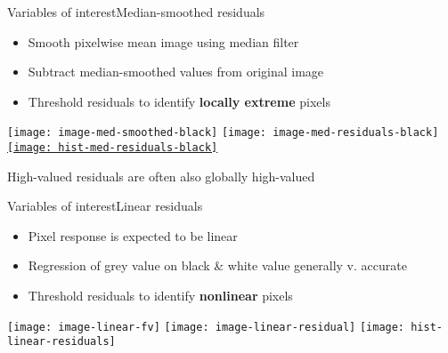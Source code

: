 \documentclass[8pt]{beamer}
\begin{document}

\begin{frame}[label = ms-res]{Variables of interest}{Median-smoothed residuals}
	\begin{itemize}
		\item Smooth pixelwise mean image using median filter
		\item Subtract median-smoothed values from original image
		\item Threshold residuals to identify \textbf{locally extreme} pixels		%
	\end{itemize}
	\begin{center}
		\texttt{[image: image-med-smoothed-black]}
		\texttt{[image: image-med-residuals-black]}
		\hyperlink{ms-res-supplemental}{\texttt{[image: hist-med-residuals-black]}}
	\end{center}
	High-valued residuals are often also globally high-valued
\end{frame}
 
 
\begin{frame}{Variables of interest}{Linear residuals}
	\begin{itemize}
		\item Pixel response is expected to be linear 		%
		\item Regression of grey value on black \& white value generally v. accurate
		\item Threshold residuals to identify \textbf{nonlinear} pixels
	\end{itemize}		

	\begin{center}
		\texttt{[image: image-linear-fv]}
		\texttt{[image: image-linear-residual]}
		\texttt{[image: hist-linear-residuals]}
	\end{center}
\end{frame}
	
	
\end{document}
